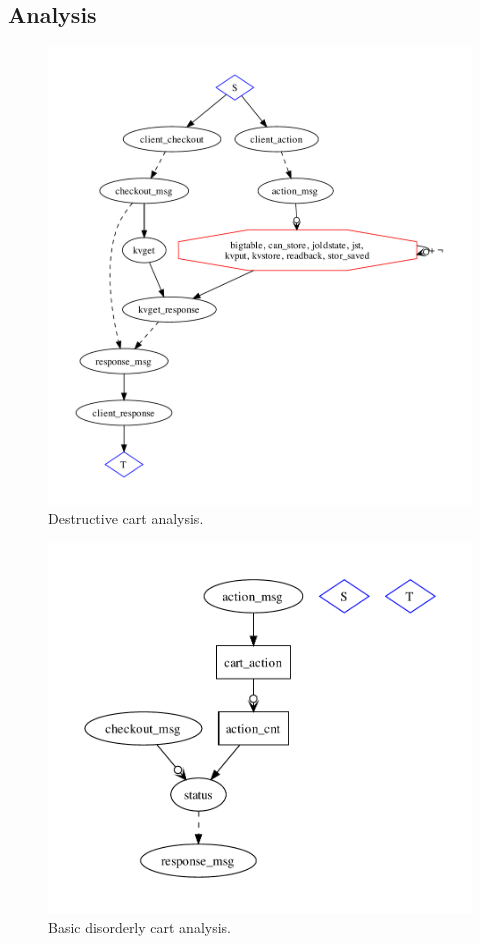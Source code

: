\subsection{Analysis}

\begin{figure}[t]
\centering
\includegraphics[width=0.7\linewidth]{fig/destructive_kvs.pdf}
\vspace{-10pt}
\caption{Destructive cart analysis.}
\label{fig:pdg-destructive-kvs-analysis}
\vspace{-2pt}
\end{figure}

\begin{figure}[t]
\centering
\includegraphics[width=0.6\linewidth]{fig/disorderly_base.pdf}
\vspace{-10pt}
\caption{Basic disorderly cart analysis.}
\label{fig:pdg-disorderly-base}
\vspace{-2pt}
\end{figure}

